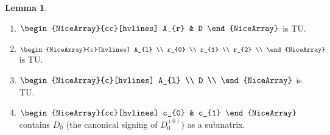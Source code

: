 \documentclass{article}
\theoremstyle{definition}
\newtheorem{lemma}[theorem]{Lemma}
\begin{document}
\begin{lemma}
\begin{enumerate}
        \item\label{item:three_sum_canonical_signing_TU_A_r_D} $\begin{NiceArray}{cc}[hvlines] A_{r} & D \end{NiceArray}$ is TU.
        \item\label{item:three_sum_canonical_signing_TU_A_l_rs} $\begin{NiceArray}{c}[hvlines] A_{l} \\ r_{0} \\ r_{1} \\ r_{2} \\ \end{NiceArray}$ is TU.
        \item\label{item:three_sum_canonical_signing_TU_A_l_D} $\begin{NiceArray}{c}[hvlines] A_{l} \\ D \\ \end{NiceArray}$ is TU.
        \item $\begin{NiceArray}{cc}[hvlines] c_{0} & c_{1} \end{NiceArray}$ contains $D_{0}$ (the canonical signing of $D_{0}^{(0)}$) as a submatrix.
    \end{enumerate}
\end{lemma}
\end{document}
